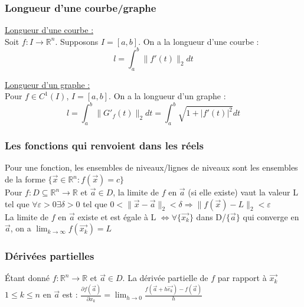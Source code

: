 \documentclass[../main.tex]{subfiles}
\begin{document}
\subsubsection{Longueur d'une courbe/graphe}
\quad \underline{Longueur d'une courbe :}\\
Soit $f:I\rightarrow \mathbb{R}^n$. Supposons $I=[a,b]$. On a la longueur d'une courbe :\\
\begin{equation}
    l = \int_a^b \parallel f'(t)\parallel_2dt
\end{equation}

\quad \underline{Longueur d'un graphe :}\\
Pour $f\in C^1(I)$, $I=[a,b]$. On a la longueur d'un graphe :\\
\begin{equation}
    l = \int_a^b \parallel G'_f(t)\parallel_2dt = \int^b_a \sqrt{1+|f'(t)|^2}dt
\end{equation}

\subsubsection{Les fonctions qui renvoient dans les réels}
Pour une fonction, les ensembles de niveaux/lignes de niveaux sont les ensembles de la forme $\{\vec{x} \in \mathbb{R}^n : f(\vec{x}) = c\}$\\

Pour $f:D \subseteq \mathbb{R}^n \rightarrow \mathbb{R}$ et $\vec{a} \in D$, la limite de $f$ en $\vec{a}$ (si elle existe) vaut la valeur L tel que $\forall \varepsilon>0 \exists \delta >0$ tel que $0< \parallel \vec{x}-\vec{a}\parallel_2 < \delta \Rightarrow \parallel f(\vec{x}) - L\parallel_2 < \varepsilon$\\

La limite de $f$ en $\vec{a}$ existe et est égale à L $\Leftrightarrow \forall \{\vec{x_k}\}$ dans D/$\{\vec{a}\}$ qui converge en $\vec{a}$, on a $\lim_{k\rightarrow \infty} f(\vec{x_k}) = L$\\

\subsubsection{Dérivées partielles}
Étant donné $f:\mathbb{R}^n \rightarrow \mathbb{R}$ et $\vec{a} \in D$. La dérivée partielle de $f$ par rapport à $\vec{x_k}$ $1\leq k  \leq n$ en $\vec{a}$ est : $\frac{\partial f(\vec{a})}{\partial x_k} = \lim_{h\rightarrow 0} \frac{f(\vec{a} + h\vec{e_k})-f(\vec{a})}{h}$\\
\end{document}
